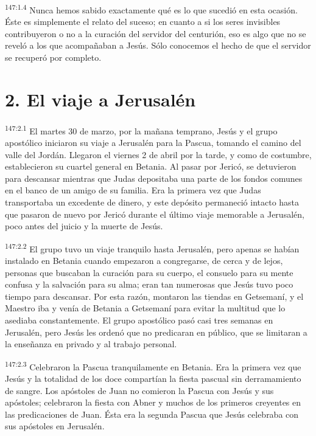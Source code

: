 \par 
\textsuperscript{147:1.4} Nunca hemos sabido exactamente qué es lo que sucedió en esta ocasión. Éste es simplemente el relato del suceso; en cuanto a si los seres invisibles contribuyeron o no a la curación del servidor del centurión, eso es algo que no se reveló a los que acompañaban a Jesús. Sólo conocemos el hecho de que el servidor se recuperó por completo.

\section*{2. El viaje a Jerusalén}
\par 
\textsuperscript{147:2.1} El martes 30 de marzo, por la mañana temprano, Jesús y el grupo apostólico iniciaron su viaje a Jerusalén para la Pascua, tomando el camino del valle del Jordán. Llegaron el viernes 2 de abril por la tarde, y como de costumbre, establecieron su cuartel general en Betania. Al pasar por Jericó, se detuvieron para descansar mientras que Judas depositaba una parte de los fondos comunes en el banco de un amigo de su familia. Era la primera vez que Judas transportaba un excedente de dinero, y este depósito permaneció intacto hasta que pasaron de nuevo por Jericó durante el último viaje memorable a Jerusalén, poco antes del juicio y la muerte de Jesús.

\par 
\textsuperscript{147:2.2} El grupo tuvo un viaje tranquilo hasta Jerusalén, pero apenas se habían instalado en Betania cuando empezaron a congregarse, de cerca y de lejos, personas que buscaban la curación para su cuerpo, el consuelo para su mente confusa y la salvación para su alma; eran tan numerosas que Jesús tuvo poco tiempo para descansar. Por esta razón, montaron las tiendas en Getsemaní, y el Maestro iba y venía de Betania a Getsemaní para evitar la multitud que lo asediaba constantemente. El grupo apostólico pasó casi tres semanas en Jerusalén, pero Jesús les ordenó que no predicaran en público, que se limitaran a la enseñanza en privado y al trabajo personal.

\par 
\textsuperscript{147:2.3} Celebraron la Pascua tranquilamente en Betania. Era la primera vez que Jesús y la totalidad de los doce compartían la fiesta pascual sin derramamiento de sangre. Los apóstoles de Juan no comieron la Pascua con Jesús y sus apóstoles; celebraron la fiesta con Abner y muchos de los primeros creyentes en las predicaciones de Juan. Ésta era la segunda Pascua que Jesús celebraba con sus apóstoles en Jerusalén.

